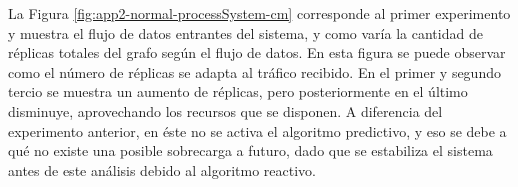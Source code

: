 %
%
%
%
%


La Figura \ref{fig:app2-normal-processSystem-cm} \normalsize{corresponde al primer experimento y muestra el flujo de datos entrantes del sistema, y como var\'ia la cantidad de r\'eplicas totales del grafo seg\'un el flujo de datos.} En esta figura \normalsize{se puede observar como el n\'umero de r\'eplicas se adapta al tr\'afico recibido. En el primer y segundo tercio se muestra un aumento de r\'eplicas, pero posteriormente en el \'ultimo disminuye, aprovechando los recursos que se disponen. A diferencia del experimento anterior, en \'este no se activa el algoritmo predictivo, y eso se debe a qu\'e no existe una posible sobrecarga a futuro, dado que se estabiliza el sistema antes de este an\'alisis debido al algoritmo reactivo.}

